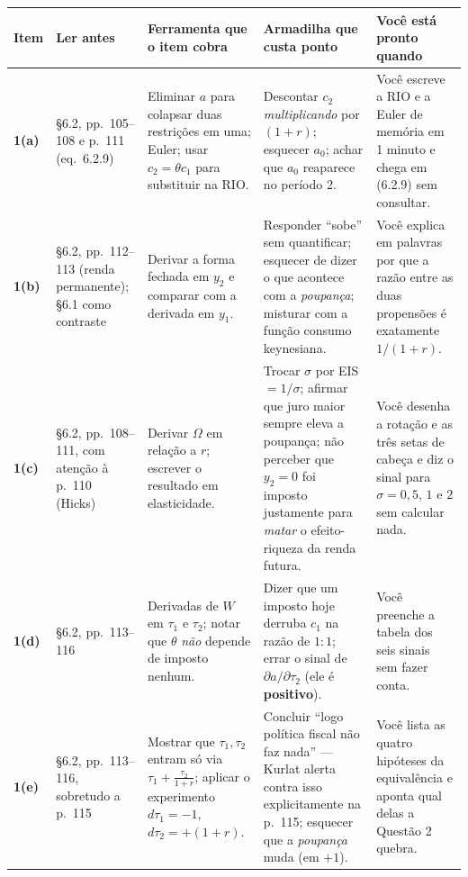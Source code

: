 \documentclass[11pt, a4paper]{article}
\begin{document}
\begin{center}
\footnotesize
\renewcommand{\arraystretch}{1.25}
\begin{tabular}{@{}p{0.9cm}p{3.0cm}p{4.0cm}p{4.0cm}p{3.4cm}@{}}
\toprule
\textbf{Item} & \textbf{Ler antes} & \textbf{Ferramenta que o item cobra} &
\textbf{Armadilha que custa ponto} & \textbf{Você está pronto quando} \\
\midrule

\textbf{1(a)} & §6.2, pp.\ 105--108 e p.\ 111 (eq.\ 6.2.9)
& Eliminar $a$ para colapsar duas restrições em uma; Euler; usar
  $c_2=\theta c_1$ para substituir na RIO.
& Descontar $c_2$ \emph{multiplicando} por $(1+r)$; esquecer $a_0$; achar que $a_0$
  reaparece no período 2.
& Você escreve a RIO e a Euler de memória em 1 minuto e chega em (6.2.9) sem consultar. \\

\textbf{1(b)} & §6.2, pp.\ 112--113 (renda permanente); §6.1 como contraste
& Derivar a forma fechada em $y_2$ e comparar com a derivada em $y_1$.
& Responder ``sobe'' sem quantificar; esquecer de dizer o que acontece com a
  \emph{poupança}; misturar com a função consumo keynesiana.
& Você explica em palavras por que a razão entre as duas propensões é exatamente
  $1/(1+r)$. \\

\textbf{1(c)} & §6.2, pp.\ 108--111, com atenção à p.\ 110 (Hicks)
& Derivar $\Omega$ em relação a $r$; escrever o resultado em elasticidade.
& Trocar $\sigma$ por EIS $=1/\sigma$; afirmar que juro maior sempre eleva a poupança;
  não perceber que $y_2=0$ foi imposto justamente para \emph{matar} o efeito-riqueza da
  renda futura.
& Você desenha a rotação e as três setas de cabeça e diz o sinal para
  $\sigma=0{,}5$, $1$ e $2$ sem calcular nada. \\

\textbf{1(d)} & §6.2, pp.\ 113--116
& Derivadas de $W$ em $\tau_1$ e $\tau_2$; notar que $\theta$ \emph{não} depende de
  imposto nenhum.
& Dizer que um imposto hoje derruba $c_1$ na razão de $1{:}1$; errar o sinal de
  $\partial a/\partial\tau_2$ (ele é \textbf{positivo}).
& Você preenche a tabela dos seis sinais sem fazer conta. \\

\textbf{1(e)} & §6.2, pp.\ 113--116, sobretudo a p.\ 115
& Mostrar que $\tau_1,\tau_2$ entram só via $\tau_1+\frac{\tau_2}{1+r}$; aplicar o
  experimento $d\tau_1=-1$, $d\tau_2=+(1+r)$.
& Concluir ``logo política fiscal não faz nada'' --- Kurlat alerta contra isso
  explicitamente na p.\ 115; esquecer que a \emph{poupança} muda (em $+1$).
& Você lista as quatro hipóteses da equivalência e aponta qual delas a Questão 2
  quebra. \\


\end{tabular}
\end{center}
\end{document}
